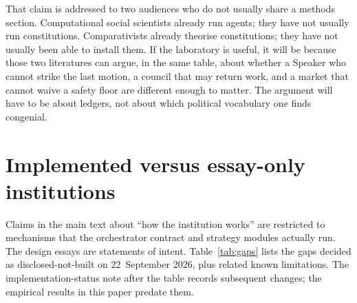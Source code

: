 \documentclass[11pt,a4paper]{article}
\begin{document}
That claim is addressed to two audiences who do not usually share a methods section.
Computational social scientists already run agents; they have not usually run
constitutions. Comparativists already theorise constitutions; they have not usually been
able to install them. If the laboratory is useful, it will be because those two
literatures can argue, in the same table, about whether a Speaker who cannot strike the
last motion, a council that may return work, and a market that cannot waive a safety
floor are different enough to matter. The argument will have to be about ledgers, not
about which political vocabulary one finds congenial.

\appendix
\section{Implemented versus essay-only institutions}
\label{app:implemented}

Claims in the main text about ``how the institution works'' are restricted to mechanisms
that the orchestrator contract and strategy modules actually run. The design essays are
statements of intent. Table~\ref{tab:gaps} lists the gaps decided as disclosed-not-built
on 22~September 2026, plus related known limitations. The implementation-status note after
the table records subsequent changes; the empirical results in this paper predate them.
\end{document}
